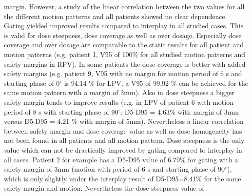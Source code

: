 \documentclass[type=dr, dr=rernat, accentcolor=tud7b,colorbacktitle, bigchapter, openright, twoside, 12pt ]{tudthesis}
\begin{document}
margin. However, a study of the linear correlation between the two values for all the different motion patterns and all patients showed no 
clear dependence.\newline
\newline
Gating yielded improved results compared to interplay in all studied cases. This is valid for dose steepness, dose coverage as 
well as over dosage. Especially dose coverage and over dosage are comparable to the static results for all patient and motion patterns 
(e.g. patient 1, V95 of 100\% for all studied motion patterns and safety margins in RPV). In some patients the dose coverage is better  
with added safety margins (e.g. patient 9, V95 with no margin for motion period of 6 s and starting phase of 0$^{\circ}$ is 94.14 \% for LPV, 
a V95 of 99.92 \% can be achieved for the same motion pattern with a margin of 3mm). Also in dose steepness a bigger safety margin tends to 
improve results (e.g. in LPV of patient 6 with motion period of 8 s with starting phase of 90$^{\circ}$: D5-D95 = 4.63\% with margin of 3mm 
versus D5-D95 = 4.21 \% with margin of 5mm). Nevertheless a linear correlation between safety margin and 
dose coverage value as well as dose homogeneity has not been found in all patients and all motion pattern. 
Dose steepness is the only value which can not be drastically improved by gating compared to interplay in all cases. Patient 2 for example 
has a D5-D95 value of 6.79\% for gating with a safety margin of 3mm (motion with period of 6 s and starting phase of 90$^{\circ}$), which is 
only slightly under the interplay result of D5-D95=8.41\% for the same safety margin and motion. Nevertheless the dose steepness value of 
\end{document}
